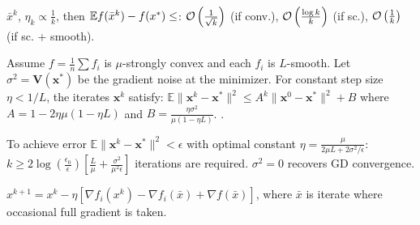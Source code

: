\begin{theorem}
    \(\bar x^k\), \(\eta_k \propto \frac{1}{k}\), then \(\mathbb{E} f(\bar x^k) - f(x^*) \leq \):
    \(\mathcal{O}\left(\frac{1}{\sqrt{k}}\right)\) (if conv.),
    \(\mathcal{O}\left(\frac{\log k}{k}\right)\) (if sc.),
    \(\mathcal{O}\left(\frac{1}{k}\right)\) (if sc. + smooth). 
\end{theorem}

\begin{theorem}
    Assume $f = \frac{1}{n} \sum f_i$ is $\mu$-strongly convex and each $f_i$ is $L$-smooth.
    Let $\sigma^2 = \mathbf{V}(\mathbf{x}^*)$ be the gradient noise at the minimizer.
    For constant step size $\eta < 1/L$, the iterates $\mathbf{x}^k$ satisfy:
    $\mathbb{E}\|\mathbf{x}^k - \mathbf{x}^*\|^2 \leq A^k \|\mathbf{x}^0 - \mathbf{x}^*\|^2 + B$
    where $A = 1 - 2\eta\mu(1 - \eta L)$ and $B = \frac{\eta\sigma^2}{\mu(1 - \eta L)}$.
    .
\end{theorem}

\begin{corollary}
    To achieve error $\mathbb{E}\|\mathbf{x}^k - \mathbf{x}^*\|^2 < \epsilon$ with optimal constant $\eta = \frac{\mu}{2\mu L + 2\sigma^2/\epsilon}$:
    $k \geq 2 \log(\frac{\epsilon_0}{\epsilon}) \left[ \frac{L}{\mu} + \frac{\sigma^2}{\mu^2 \epsilon} \right]$ iterations are required. \(\sigma^2 = 0\) recovers GD convergence.
\end{corollary}

\begin{definition}
    \(x^{k+1} = x^k - \eta \left[\nabla f_i(x^k) - \nabla f_i(\bar x) + \nabla f(\bar x)\right]\),
    where \(\bar x\) is iterate where occasional full gradient is taken.
\end{definition}

